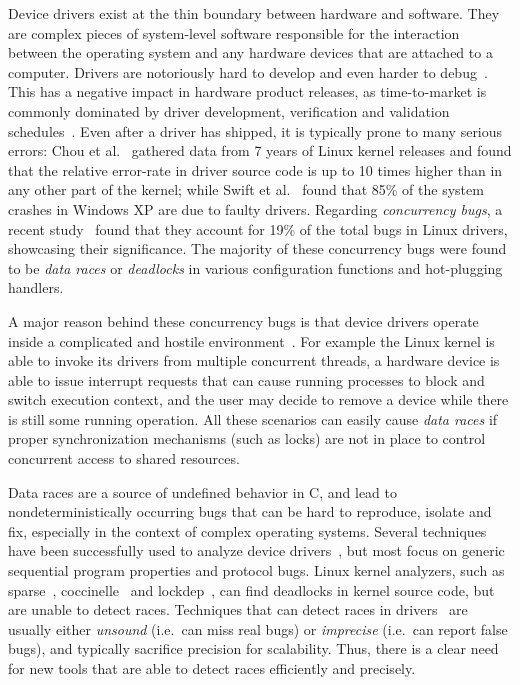 Device drivers exist at the thin boundary between hardware and software. They are complex pieces of system-level software responsible for the interaction between the operating system and any hardware devices that are attached to a computer. Drivers are notoriously hard to develop and even harder to debug~\cite{corbet2005linux}. This has a negative impact in hardware product releases, as time-to-market is commonly dominated by driver development, verification and validation schedules~\cite{yavatkar2012era}.
%
Even after a driver has shipped, it is typically prone to many serious errors: Chou et al.~\cite{chou2001empirical} gathered data from 7 years of Linux kernel releases and found that the relative error-rate in driver source code is up to 10 times higher than in any other part of the kernel; while Swift et al.~\cite{Swift2003windowsxp} found that 85\% of the system crashes in Windows XP are due to faulty drivers. Regarding \emph{concurrency bugs}, a recent study~\cite{ryzhyk2009dingo} found that they account for 19\% of the total bugs in Linux drivers, showcasing their significance. The majority of these concurrency bugs were found to be \emph{data races} or \emph{deadlocks} in various configuration functions and hot-plugging handlers.

A major reason behind these concurrency bugs is that device drivers operate inside a complicated and hostile environment~\cite{corbet2005linux}. For example the Linux kernel is able to invoke its drivers from multiple concurrent threads, a hardware device is able to issue interrupt requests that can cause running processes to block and switch execution context, and the user may decide to remove a device while there is still some running operation. All these scenarios can easily cause \emph{data races} if proper synchronization mechanisms (such as locks) are not in place to control concurrent access to shared resources.

Data races are a source of undefined behavior in C, and lead to nondeterministically occurring bugs that can be hard to reproduce, isolate and fix, especially in the context of complex operating systems.
%
Several techniques have been successfully used to analyze device drivers~\cite{ball2006thorough, clarke2004predicate, engler2000checking, henzinger2002temporal, cook2006termination, kuznetsov2010testing, renzelmann2012symdrive, lal2012corral}, but most focus on generic sequential program properties and protocol bugs. Linux kernel analyzers, such as sparse~\cite{corbet2004sparse}, coccinelle~\cite{padioleau2008doc} and lockdep~\cite{corbet2006lock}, can find deadlocks in kernel source code, but are unable to detect races. Techniques that can detect races in drivers~\cite{qadeer2004kiss, pratikakis2006locksmith, voung2007relay, lal2012corral} are usually either \emph{unsound} (i.e.\ can miss real bugs) or \emph{imprecise} (i.e.\ can report false bugs), and typically sacrifice precision for scalability. Thus, there is a clear need for new tools that are able to detect races efficiently and precisely.

